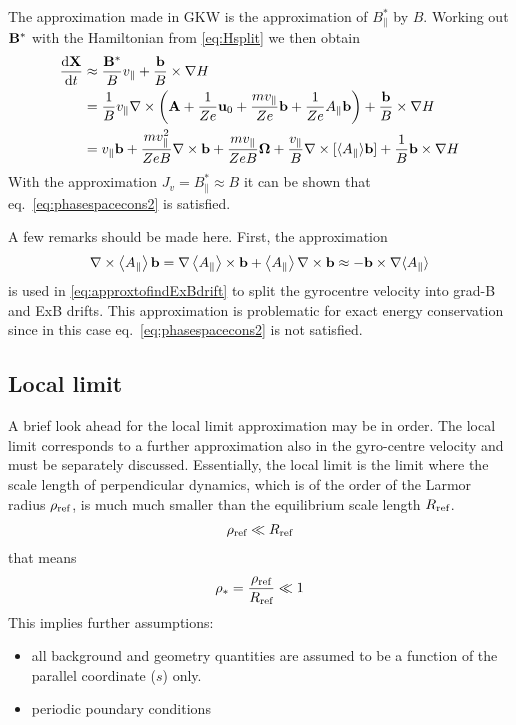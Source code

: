 The approximation made in GKW is the approximation of $B_\parallel^*$ by $B$. Working out ${\bf B}^*$ 
with the Hamiltonian from \eqref{eq:Hsplit}
we then obtain 
\begin{align} 
\frac{\mathrm{d} {\bf X}}{\mathrm{d} t}  &\approx 
\frac{{\bf B}^* }{ B} v_\parallel 
+ \frac{{\bf b}}{ B} \times \nabla H\\
&=
\frac{1}{B} v_\parallel \nabla\times\left({\bf A} + \frac{1}{Ze}{\bf u}_0 + \frac{m v_\parallel}{Ze} {\bf b} + \frac{1}{Ze}A_\parallel {\bf b} \right)
+ \frac{{\bf b}}{ B} \times \nabla H
\\
&=v_\parallel {\bf b} + \frac{m v_\parallel^2}{ZeB} \nabla \times {\bf b} + \frac{m v_\parallel}{ZeB} {\bf \Omega}
 +  \frac{v_\parallel}{B} \nabla \times [ \langle A_\parallel \rangle {\bf b} ] 
+ \frac{1 }{ B} {\bf b} \times \nabla H 
\label{eq:gyrocentrevelocity2}
\end{align}
With the approximation $J_v = B^*_\parallel \approx B$ it can be shown that eq.~\eqref{eq:phasespacecons2} is satisfied.

A few remarks should be made here. First, the approximation
\begin{equation} 
\nabla \times \left\langle  A_\parallel\right\rangle {\bf b}
= 
\nabla \left\langle A_\parallel\right\rangle\times\mathbf{b} + \left\langle A_\parallel\right\rangle\nabla\times\mathbf{b}
 \approx - {\bf b} \times \nabla \langle A_\parallel \rangle 
\label{eq:approxtofindExBdrift2}
\end{equation}
is used in \eqref{eq:approxtofindExBdrift} to split the gyrocentre velocity into grad-B and ExB drifts.
This approximation is problematic for exact energy conservation since in this case eq.~\eqref{eq:phasespacecons2} is not satisfied. 

\subsection{Local limit} 

\label{energy-conservation-local-limit}
A brief look ahead for the local limit approximation may be in order. The local limit corresponds to a further approximation also in the gyro-centre velocity and must be 
separately discussed. 
Essentially, the local limit is the limit where the scale length of perpendicular dynamics, which is of the order of the Larmor radius $\rho_{\text{ref}}$, is much much smaller than the equilibrium scale length $R_{\text{ref}}$.
\begin{align}
  \rho_{\text{ref}} \ll R_{\text{ref}}
\end{align}
that means
\begin{align}
  \rho_* = \frac{\rho_{\text{ref}}}{R_{\text{ref}}} \ll 1
\end{align}
This implies further assumptions:
\begin{itemize}
\item all background and geometry quantities are assumed to be a function of the parallel coordinate ($s$) only.
\item periodic poundary conditions
\end{itemize}

